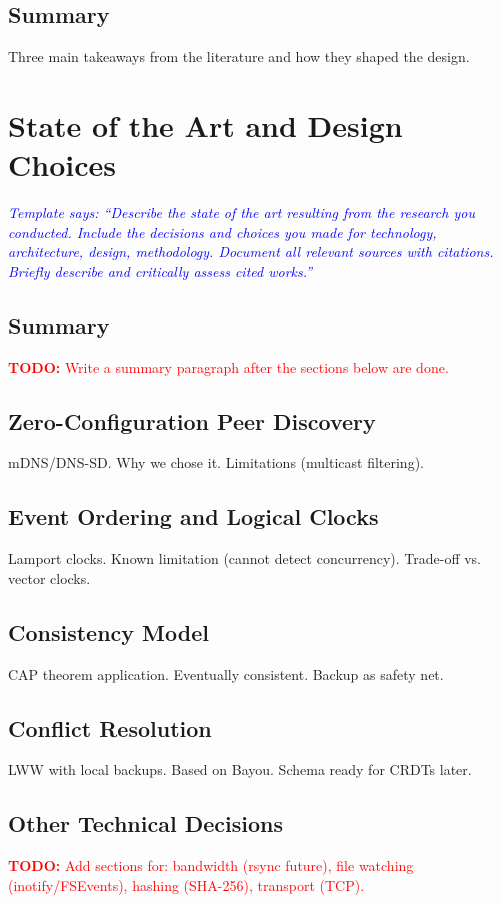 \documentclass[12pt,oneside]{report}
\newcommand{\note}[1]{\textcolor{blue}{\textit{#1}}}
\newcommand{\todo}[1]{\textcolor{red}{\textbf{TODO:} #1}}
\begin{document}
\section{Summary}
Three main takeaways from the literature and how they shaped the design.

\chapter{State of the Art and Design Choices}

\note{Template says: ``Describe the state of the art resulting from the research you conducted. Include the decisions and choices you made for technology, architecture, design, methodology. Document all relevant sources with citations. Briefly describe and critically assess cited works.''}

\section{Summary}
\todo{Write a summary paragraph after the sections below are done.}

\section{Zero-Configuration Peer Discovery}
mDNS/DNS-SD. Why we chose it. Limitations (multicast filtering).

\section{Event Ordering and Logical Clocks}
Lamport clocks. Known limitation (cannot detect concurrency). Trade-off vs. vector clocks.

\section{Consistency Model}
CAP theorem application. Eventually consistent. Backup as safety net.

\section{Conflict Resolution}
LWW with local backups. Based on Bayou. Schema ready for CRDTs later.

\section{Other Technical Decisions}
\todo{Add sections for: bandwidth (rsync future), file watching (inotify/FSEvents), hashing (SHA-256), transport (TCP).}
\end{document}
